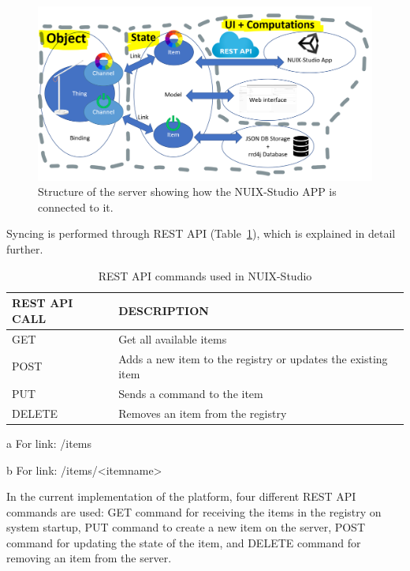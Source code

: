 \begin{figure}
  \centering
  \includegraphics[width=0.9\linewidth]{figures/ExtendedServerStructure.png}
  \caption{Structure of the server showing how the NUIX-Studio APP is connected to it.}
  \label{fig:ExtendedServerStructure-figure}
\end{figure}

Syncing is performed through REST API (Table~\ref{tab:rest-api-table}), which is explained in detail further.

\begin{table}
  \centering
  \begin{threeparttable}[c]
    \caption{REST API commands used in NUIX-Studio}
    \label{tab:rest-api-table}
    \begin{tabular}{ll}
      \toprule
      REST API CALL    &         DESCRIPTION                 \\
      \midrule
      GET\tnote{a} & Get all available items \\
      POST\tnote{b} & Adds a new item to the registry or updates the existing item    \\
      PUT\tnote{b}        & Sends a command to the item                              \\
      DELETE\tnote{b}        & Removes an item from the registry          \\
      \bottomrule
    \end{tabular}
    \begin{tablenotes}
      \item [a] For link: /items
      \item [b] For link: /items/<itemname>
    \end{tablenotes}
  \end{threeparttable}
\end{table}

In the current implementation of the platform, four different REST API commands are used: GET command for receiving the items in the registry on system startup, PUT command to create a new item on the server, POST command for updating the state of the item, and DELETE command for removing an item from the server.

